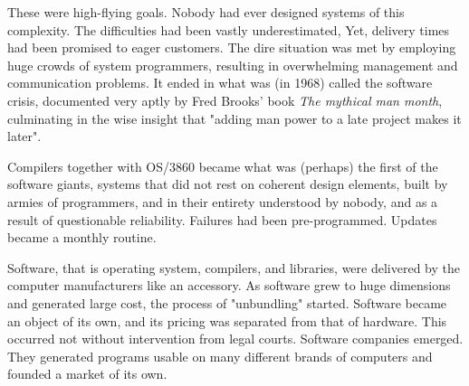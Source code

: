 These were high-flying goals. Nobody had ever designed systems of this
complexity. The difficulties had been vastly underestimated, Yet, delivery times
had been promised to eager customers. The dire situation was met by employing
huge crowds of system programmers, resulting in overwhelming management and
communication problems. It ended in what was (in 1968) called the software crisis,
documented very aptly by Fred Brooks’ book \emph{The mythical man month}, culminating
in the wise insight that "adding man power to a late project makes it later".

Compilers together with OS/3860 became what was (perhaps) the first of the
software giants, systems that did not rest on coherent design elements, built by
armies of programmers, and in their entirety understood by nobody, and as a result
of questionable reliability. Failures had been pre-programmed. Updates became a
monthly routine.

Software, that is operating system, compilers, and libraries, were delivered by the
computer manufacturers like an accessory. As software grew to huge dimensions
and generated large cost, the process of "unbundling" started. Software became
an object of its own, and its pricing was separated from that of hardware. This
occurred not without intervention from legal courts. Software companies emerged.
They generated programs usable on many different brands of computers and
founded a market of its own.
